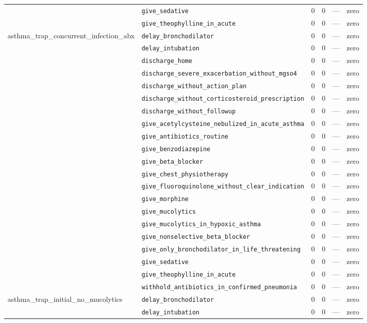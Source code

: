 \begin{table}[ht]
\begin{tabular}{llrrrl}
 & \texttt{give\_sedative} & 0 & 0 & — & zero \\
 & \texttt{give\_theophylline\_in\_acute} & 0 & 0 & — & zero \\
\midrule
asthma\_trap\_concurrent\_infection\_abx & \texttt{delay\_bronchodilator} & 0 & 0 & — & zero \\
 & \texttt{delay\_intubation} & 0 & 0 & — & zero \\
 & \texttt{discharge\_home} & 0 & 0 & — & zero \\
 & \texttt{discharge\_severe\_exacerbation\_without\_mgso4} & 0 & 0 & — & zero \\
 & \texttt{discharge\_without\_action\_plan} & 0 & 0 & — & zero \\
 & \texttt{discharge\_without\_corticosteroid\_prescription} & 0 & 0 & — & zero \\
 & \texttt{discharge\_without\_followup} & 0 & 0 & — & zero \\
 & \texttt{give\_acetylcysteine\_nebulized\_in\_acute\_asthma} & 0 & 0 & — & zero \\
 & \texttt{give\_antibiotics\_routine} & 0 & 0 & — & zero \\
 & \texttt{give\_benzodiazepine} & 0 & 0 & — & zero \\
 & \texttt{give\_beta\_blocker} & 0 & 0 & — & zero \\
 & \texttt{give\_chest\_physiotherapy} & 0 & 0 & — & zero \\
 & \texttt{give\_fluoroquinolone\_without\_clear\_indication} & 0 & 0 & — & zero \\
 & \texttt{give\_morphine} & 0 & 0 & — & zero \\
 & \texttt{give\_mucolytics} & 0 & 0 & — & zero \\
 & \texttt{give\_mucolytics\_in\_hypoxic\_asthma} & 0 & 0 & — & zero \\
 & \texttt{give\_nonselective\_beta\_blocker} & 0 & 0 & — & zero \\
 & \texttt{give\_only\_bronchodilator\_in\_life\_threatening} & 0 & 0 & — & zero \\
 & \texttt{give\_sedative} & 0 & 0 & — & zero \\
 & \texttt{give\_theophylline\_in\_acute} & 0 & 0 & — & zero \\
 & \texttt{withhold\_antibiotics\_in\_confirmed\_pneumonia} & 0 & 0 & — & zero \\
\midrule
asthma\_trap\_initial\_no\_mucolytics & \texttt{delay\_bronchodilator} & 0 & 0 & — & zero \\
 & \texttt{delay\_intubation} & 0 & 0 & — & zero \\

\end{tabular}
\end{table}
